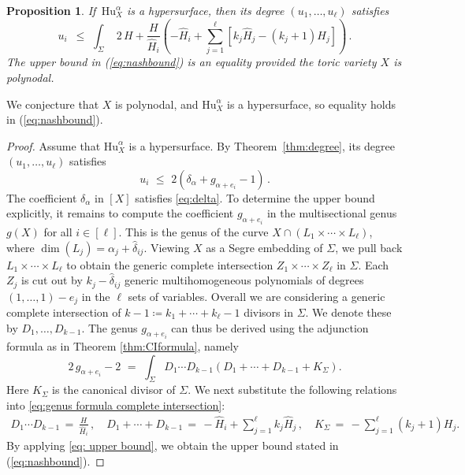 \documentclass[12pt]{article}
\newtheorem{proposition}[theorem]{Proposition}
\theoremstyle{definition}
\begin{document}
\begin{proposition}\label{prop: multidegree games}
If $\,\mathrm{Hu}_X^{\alpha}$ is a hypersurface, then its degree $(u_1,\ldots,u_\ell)$ satisfies
\begin{equation}
\label{eq:nashbound}
	u_i \,\,\,\le\,\, 
\int_\Sigma \, \, 2\,H+\frac{H}{\hat{H}_i}\left(-\hat{H}_i+\sum_{j=1}^\ell \left[k_j\hat{H}_j-(k_j+1)H_j\right]\right)\,.
\end{equation}
The upper bound in (\ref{eq:nashbound}) is an equality provided
the toric variety $X$ is polynodal.
\end{proposition}

We conjecture that $X$ is polynodal, and $\mathrm{Hu}_X^{\alpha}$ is a hypersurface, so
equality holds in (\ref{eq:nashbound}).

\begin{proof}
	Assume that $\mathrm{Hu}_X^{\alpha}$ is a hypersurface. By Theorem~\ref{thm:degree}, its degree 
	$(u_1,\ldots,u_\ell)$ satisfies
	\begin{equation}\label{eq: upper bound}
	u_i \,\,\le \,\,2(\delta_\alpha+g_{\alpha+e_i}-1)\,.
	\end{equation}
	The coefficient $\delta_\alpha$ in $[X]$ satisfies \eqref{eq:delta}.
    To determine the upper bound explicitly, it remains to compute the coefficient $g_{\alpha+e_i}$ in the multisectional genus $g(X)$ for all $i\in[\ell]$. This is the genus of the curve $X\cap (L_1\times\cdots\times L_\ell)$, where $\dim(L_j)=\alpha_j+\hat{\delta}_{ij}$. Viewing $X$ as a Segre embedding of $\Sigma$, we pull back $L_1 \times \cdots
    \times L_\ell $ to obtain the generic complete intersection $Z_1\times\cdots\times Z_\ell$ in $\Sigma$. Each $Z_j$ is cut out by $k_j-\hat{\delta}_{ij}$ generic multihomogeneous polynomials of degrees $(1,\ldots,1)-e_j$ in the $\ell$ sets of variables. Overall we are considering a generic complete intersection of $k-1\coloneqq k_1+\cdots+k_\ell-1$ divisors in $\Sigma$. We denote these by
     $D_1,\ldots,D_{k-1}$. The genus $g_{\alpha+e_i}$
          can thus be derived using the adjunction formula as in Theorem \ref{thm:CIformula}, namely
	\begin{equation}\label{eq:genus formula complete intersection}
	2\,g_{\alpha+e_i}-2 \,\,= \,\,\int_\Sigma D_1\cdots D_{k-1}\left(D_1+\cdots+D_{k-1}+K_{\Sigma}\right).
	\end{equation}
    Here $K_\Sigma$ is the canonical divisor of $\Sigma$.
    We next substitute the following relations into
		 \eqref{eq:genus formula complete intersection}:
	\begin{align*}
		D_1\cdots D_{k-1} \,=\, \frac{H}{\hat{H}_i}\,,\quad D_1+\cdots+D_{k-1} \,=\, -\hat{H}_i+\sum_{j=1}^\ell k_j\hat{H}_j\,,\quad K_\Sigma \,=\, -\sum_{j=1}^\ell(k_j+1)H_j.
	\end{align*}
By applying \eqref{eq: upper bound}, we obtain the upper bound stated in (\ref{eq:nashbound}).
\end{proof}
\end{document}
